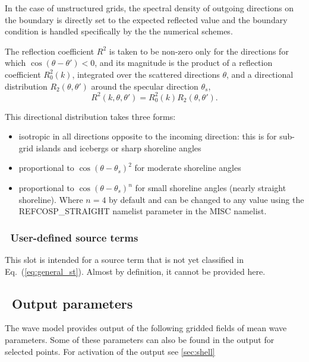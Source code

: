 In the case of unstructured grids, the spectral density of outgoing directions on the boundary 
is directly set to the expected reflected value and the boundary condition is handled specifically by the the numerical schemes. 

The reflection coefficient $R^2$ is taken to be non-zero only for the directions for which  $\cos(\theta-\theta')<0$, and its magnitude 
is the product of a reflection coefficient $R_0^2(k)$, integrated over the scattered directions $\theta$, 
and a directional distribution  $R_2(\theta,\theta')$ around the specular direction $\theta_s$,  
\begin{equation} 
R^2(k,\theta,\theta')  =  R_0^2(k) R_2(\theta,\theta').
\end{equation}

This directional distribution takes three forms: 
\begin{itemize}
 \item isotropic in all directions opposite to the incoming direction: this is for sub-grid islands and icebergs or sharp shoreline angles
 \item proportional to $\cos(\theta-\theta_s)^2$ for moderate shoreline angles
 \item proportional to $\cos(\theta-\theta_s)^n$ for small shoreline angles (nearly straight shoreline). Where $n=4$ by default and can be changed 
to any value using the REFCOSP\_STRAIGHT namelist parameter in the MISC namelist.
\end{itemize}


\vsssub
\subsubsection{~User-defined source terms} \label{sec:sxx}
\vsssub

This slot is intended for a source term that is not yet classified in
Eq.~(\ref{eq:general_st}). Almost by definition, it cannot be provided here.


\vssub
\subsection{~Output parameters} \label{sub:outpars}
\vssub

The wave model provides output of the following gridded fields of mean wave
parameters. Some of these parameters can also be found in the output for
selected points. For activation of the output see \para\ref{sec:shell}

